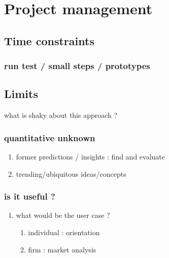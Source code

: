 \documentclass[11pt]{article}
\begin{document}
\section{Project management}
\label{sec:orgedcbb64}
\subsection{Time constraints}
\label{sec:org3477a5d}
\subsubsection{run test / small steps / prototypes}
\label{sec:orgd708863}
\subsection{Limits}
\label{sec:org605561e}
what is shaky about this approach ?
\subsubsection{quantitative unknown}
\label{sec:org88c8f5e}
\begin{enumerate}
\item former predictions / insights : find and evaluate
\label{sec:org99a3cac}
\item trending/ubiquitous ideas/concepts
\label{sec:orga90ea1e}
\end{enumerate}
\subsubsection{is it useful ?}
\label{sec:org6b2b384}
\begin{enumerate}
\item what would be the user case ?
\label{sec:org507cc47}
\begin{enumerate}
\item individual : orientation
\label{sec:org82df309}
\item firm : market analysis
\label{sec:orgb93c76b}
\end{enumerate}
\end{enumerate}
\end{document}
